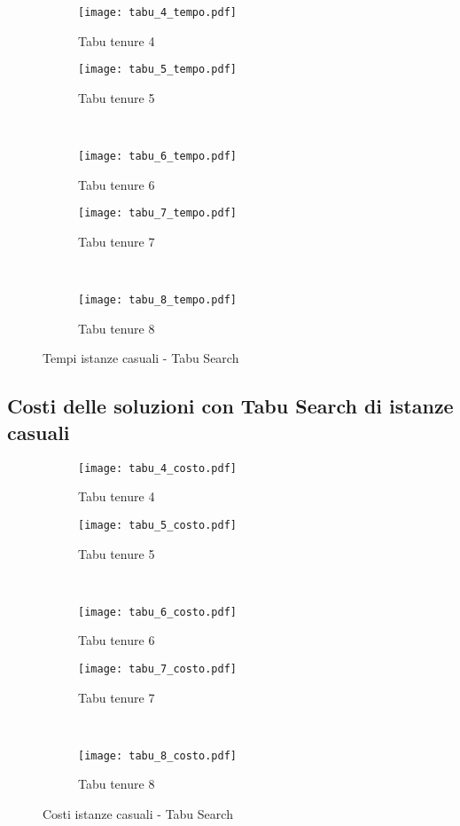 \begin{figure}[H]
	\centering
	\begin{subfigure}[b]{.45\textwidth}
		\texttt{[image: tabu\_4\_tempo.pdf]}
		\caption{Tabu tenure 4}
	\end{subfigure}
	\quad
	\begin{subfigure}[b]{.45\textwidth}
		\texttt{[image: tabu\_5\_tempo.pdf]}
		\caption{Tabu tenure 5}
	\end{subfigure}
	\\
	\begin{subfigure}[b]{.45\textwidth}
		\texttt{[image: tabu\_6\_tempo.pdf]}
		\caption{Tabu tenure 6}
	\end{subfigure}
	\quad
	\begin{subfigure}[b]{.45\textwidth}
		\texttt{[image: tabu\_7\_tempo.pdf]}
		\caption{Tabu tenure 7}
	\end{subfigure}
	\\
	\begin{subfigure}[b]{.45\textwidth}
		\texttt{[image: tabu\_8\_tempo.pdf]}
		\caption{Tabu tenure 8}
	\end{subfigure}
	\caption{Tempi istanze casuali - Tabu Search}
	\label{fig:tempi tabu}
\end{figure}


\subsection{Costi delle soluzioni con Tabu Search di istanze casuali}

\begin{figure}[H]
	\centering
	\begin{subfigure}[b]{.45\textwidth}
		\texttt{[image: tabu\_4\_costo.pdf]}
		\caption{Tabu tenure 4}
	\end{subfigure}
	\quad
	\begin{subfigure}[b]{.45\textwidth}
		\texttt{[image: tabu\_5\_costo.pdf]}
		\caption{Tabu tenure 5}
	\end{subfigure}
	\\
	\begin{subfigure}[b]{.45\textwidth}
		\texttt{[image: tabu\_6\_costo.pdf]}
		\caption{Tabu tenure 6}
	\end{subfigure}
	\quad
	\begin{subfigure}[b]{.45\textwidth}
		\texttt{[image: tabu\_7\_costo.pdf]}
		\caption{Tabu tenure 7}
	\end{subfigure}
	\\
	\begin{subfigure}[b]{.45\textwidth}
		\texttt{[image: tabu\_8\_costo.pdf]}
		\caption{Tabu tenure 8}
	\end{subfigure}
	\caption{Costi istanze casuali - Tabu Search}
	\label{fig:costi tabu}
\end{figure}

